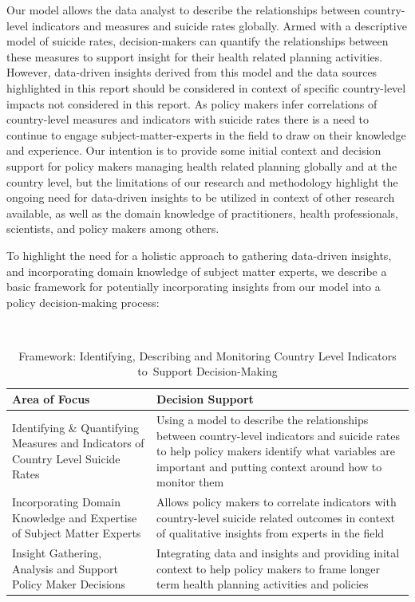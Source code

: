 \documentclass[]{article}
\begin{document}
Our model allows the data analyst to describe the relationships between
country-level indicators and measures and suicide rates globally. Armed
with a descriptive model of suicide rates, decision-makers can quantify
the relationships between these measures to support insight for their
health related planning activities. However, data-driven insights
derived from this model and the data sources highlighted in this report
should be considered in context of specific country-level impacts not
considered in this report. As policy makers infer correlations of
country-level measures and indicators with suicide rates there is a need
to continue to engage subject-matter-experts in the field to draw on
their knowledge and experience. Our intention is to provide some initial
context and decision support for policy makers managing health related
planning globally and at the country level, but the limitations of our
research and methodology highlight the ongoing need for data-driven
insights to be utilized in context of other research available, as well
as the domain knowledge of practitioners, health professionals,
scientists, and policy makers among others.

To highlight the need for a holistic approach to gathering data-driven
insights, and incorporating domain knowledge of subject matter experts,
we describe a basic framework for potentially incorporating insights
from our model into a policy decision-making process:

\begin{table}[H]
\centering 
\caption{Framework: Identifying, Describing and Monitoring Country Level Indicators to Support Decision-Making}
\
\begin{tabular}{p{7cm}p{9cm}}  
\hline  
   Area of Focus  & Decision Support  \\   
\hline 
 Identifying \& Quantifying Measures and Indicators of Country Level Suicide Rates &  Using a model to describe the relationships between country-level indicators and suicide rates to help policy makers identify what variables are important and putting context around how to monitor them \\   
 \hline 
Incorporating Domain Knowledge and Expertise of Subject Matter Experts & Allows policy makers to correlate indicators with country-level suicide related outcomes in context of qualitative insights from experts in the field \\   
\hline 
Insight Gathering, Analysis and Support Policy Maker Decisions & Integrating data and insights and providing inital context to help policy makers to frame longer term health planning activities and policies \\
\hline 
\end{tabular} 
\end{table}
\end{document}
